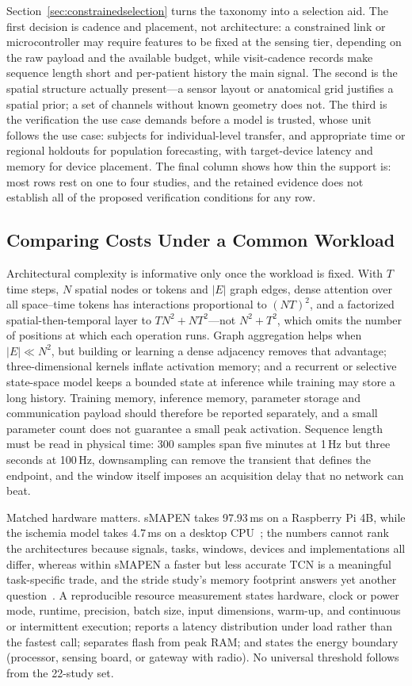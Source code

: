 \documentclass[journal]{IEEEtran}
\begin{document}
Section~\ref{sec:constrainedselection} turns the taxonomy into a selection aid. The first decision is cadence and placement, not architecture: a constrained link or microcontroller may require features to be fixed at the sensing tier, depending on the raw payload and the available budget, while visit-cadence records make sequence length short and per-patient history the main signal. The second is the spatial structure actually present---a sensor layout or anatomical grid justifies a spatial prior; a set of channels without known geometry does not. The third is the verification the use case demands before a model is trusted, whose unit follows the use case: subjects for individual-level transfer, and appropriate time or regional holdouts for population forecasting, with target-device latency and memory for device placement. The final column shows how thin the support is: most rows rest on one to four studies, and the retained evidence does not establish all of the proposed verification conditions for any row.

\subsection{Comparing Costs Under a Common Workload}
\label{sec:workload}
Architectural complexity is informative only once the workload is fixed. With $T$ time steps, $N$ spatial nodes or tokens and $|E|$ graph edges, dense attention over all space--time tokens has interactions proportional to $(NT)^2$, and a factorized spatial-then-temporal layer to $TN^2+NT^2$---not $N^2+T^2$, which omits the number of positions at which each operation runs. Graph aggregation helps when $|E|\ll N^2$, but building or learning a dense adjacency removes that advantage; three-dimensional kernels inflate activation memory; and a recurrent or selective state-space model keeps a bounded state at inference while training may store a long history. Training memory, inference memory, parameter storage and communication payload should therefore be reported separately, and a small parameter count does not guarantee a small peak activation. Sequence length must be read in physical time: 300 samples span five minutes at 1\,Hz but three seconds at 100\,Hz, downsampling can remove the transient that defines the endpoint, and the window itself imposes an acquisition delay that no network can beat.

Matched hardware matters. sMAPEN takes 97.93\,ms on a Raspberry Pi 4B, while the ischemia model takes 4.7\,ms on a desktop CPU~\cite{lin2024smapen,li2026edgeischemia}; the numbers cannot rank the architectures because signals, tasks, windows, devices and implementations all differ, whereas within sMAPEN a faster but less accurate TCN is a meaningful task-specific trade, and the stride study's memory footprint answers yet another question~\cite{verbiest2023gaitstride}. A reproducible resource measurement states hardware, clock or power mode, runtime, precision, batch size, input dimensions, warm-up, and continuous or intermittent execution; reports a latency distribution under load rather than the fastest call; separates flash from peak RAM; and states the energy boundary (processor, sensing board, or gateway with radio). No universal threshold follows from the 22-study set.
\end{document}

